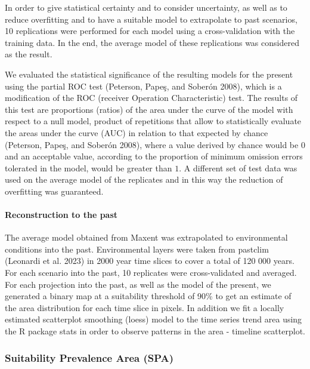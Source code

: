 \documentclass[
]{article}
\begin{document}
In order to give statistical certainty and to consider uncertainty, as
well as to reduce overfitting and to have a suitable model to
extrapolate to past scenarios, 10 replications were performed for each
model using a cross-validation with the training data. In the end, the
average model of these replications was considered as the result.

We evaluated the statistical significance of the resulting models for
the present using the partial ROC test (Peterson, Papeş, and Soberón
2008), which is a modification of the ROC (receiver Operation
Characteristic) test. The results of this test are proportions (ratios)
of the area under the curve of the model with respect to a null model,
product of repetitions that allow to statistically evaluate the areas
under the curve (AUC) in relation to that expected by chance (Peterson,
Papeş, and Soberón 2008), where a value derived by chance would be \(0\)
and an acceptable value, according to the proportion of minimum omission
errors tolerated in the model, would be greater than \(1\). A different
set of test data was used on the average model of the replicates and in
this way the reduction of overfitting was guaranteed.

\hypertarget{reconstruction-to-the-past}{%
\paragraph{Reconstruction to the
past}\label{reconstruction-to-the-past}}

The average model obtained from Maxent was extrapolated to environmental
conditions into the past. Environmental layers were taken from pastclim
(Leonardi et al. 2023) in 2000 year time slices to cover a total of 120
000 years. For each scenario into the past, 10 replicates were
cross-validated and averaged. For each projection into the past, as well
as the model of the present, we generated a binary map at a suitability
threshold of 90\% to get an estimate of the area distribution for each
time slice in pixels. In addition we fit a locally estimated scatterplot
smoothing (loess) model to the time series trend area using the R
package stats in order to observe patterns in the area - timeline
scatterplot.

\hypertarget{suitability-prevalence-area-spa}{%
\subsubsection{Suitability Prevalence Area
(SPA)}\label{suitability-prevalence-area-spa}}
\end{document}
